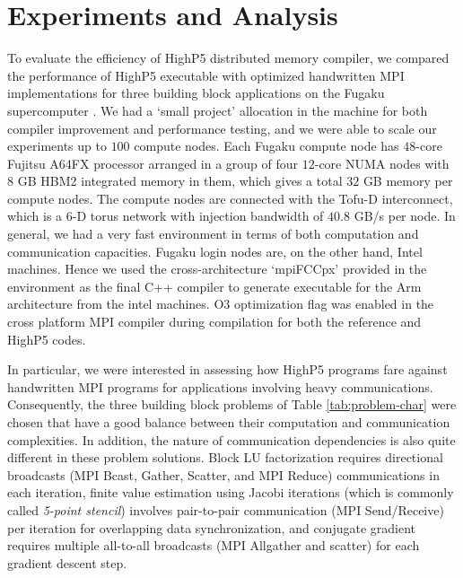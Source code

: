 \documentclass[ASNA,twocolumn]{USG} %
\begin{document}
{\section{Experiments and Analysis}
\label{sec:experience}
To evaluate the efficiency of HighP5 distributed memory compiler, we compared the performance of HighP5 executable with optimized handwritten MPI implementations for three building block applications on the Fugaku supercomputer \citep{9492415}\citep{9658212}. We had a `small project' allocation in the machine for both compiler improvement and performance testing, and we were able to scale our experiments up to $100$ compute nodes. Each Fugaku compute node has $48$-core Fujitsu A64FX processor arranged in a group of four $12$-core NUMA nodes with $8$ GB HBM2 integrated memory in them, which gives a total $32$ GB memory per compute nodes. The compute nodes are connected with the Tofu-D interconnect, which is a $6$-D torus network with injection bandwidth of $40.8$ GB/s per node. In general, we had a very fast environment in terms of both computation and communication capacities. Fugaku login nodes are, on the other hand, Intel machines. Hence we used the cross-architecture `mpiFCCpx' provided in the environment as the final C++ compiler to generate executable for the Arm architecture from the intel machines. O3 optimization flag was enabled in the cross platform MPI compiler during compilation for both the reference and HighP5 codes.

In particular, we were interested in assessing how HighP5 programs fare against handwritten MPI programs for applications involving heavy communications. Consequently, the three building block problems of Table \ref{tab:problem-char} were chosen that have a good balance between their computation and communication complexities. In addition, the nature of communication dependencies is also quite different in these problem solutions. Block LU factorization requires directional broadcasts (MPI Bcast, Gather, Scatter, and MPI Reduce) communications in each iteration, finite value estimation using Jacobi iterations (which is commonly called \textit{5-point stencil}) involves pair-to-pair communication (MPI Send/Receive) per iteration for overlapping data synchronization, and conjugate gradient requires multiple all-to-all broadcasts (MPI Allgather and scatter) for each gradient descent step.

}
\end{document}
